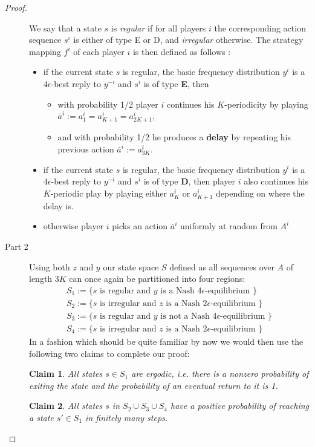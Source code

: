\documentclass[a4paper]{article}
\theoremstyle{plain}
\newtheorem{claim}{Claim}
\theoremstyle{remark}
\begin{document}
\begin{proof}
\begin{description}
		We say that a state $s$ is \emph{regular} if for all players $i$ the corresponding action
		sequence $s^i$ is either of type E or D, and \emph{irregular} otherwise.
		The strategy mapping $f^i$ of each player $i$ is then defined as follows :
		\begin{itemize}
			\item if the current state $s$ is regular, the basic frequency distribution $y^i$ is a $4\epsilon$-best reply to $y^{-i}$ %
			and $s^i$ is of type {\bf E}, then \begin{itemize}
				\item with probability 1/2 player $i$ continues his $K$-periodicity by playing $\bar{a}^i := a^i_1 = a^i_{K+1} = a^i_{2K+1}$,
				\item and with probability 1/2 he produces a {\bf delay} by repeating his previous action $\bar{a}^i := a^i_{3K}$.
			\end{itemize}
			\item if the current state $s$ is regular, the basic frequency distribution $y^i$ is a $4\epsilon$-best reply to $y^{-i}$ %
			and $s^i$ is of type {\bf D}, then player $i$ also continues his $K$-periodic play by playing either $a^i_K$ or $a^i_{K+1}$ depending
			on where the delay is.
			\item otherwise player $i$ picks an action $\bar{a}^i$ uniformly at random from $A^i$
		\end{itemize}
		\item[Part 2] Using both $z$ and $y$ our state space $S$ defined as all sequences over $A$ of length $3K$ can once again be partitioned
		into four regions:
		\begin{gather*}
			S_1 := \{ s \text{ is regular and $y$ is a Nash $4\epsilon$-equilibrium }\}\\
			S_2 := \{ s \text{ is irregular and $z$ is a Nash $2\epsilon$-equilibrium }\}\\
			S_3 := \{ s \text{ is regular and $y$ is not a Nash $4\epsilon$-equilibrium }\}\\
			S_4 := \{ s \text{ is irregular and $z$ is a Nash $2\epsilon$-equilibrium }\}
		\end{gather*}
		In a fashion which should be quite familiar by now we would then use the following two claims
		to complete our proof:
		\begin{claim}
			All states $s \in S_1$ are ergodic, i.e. there is a nonzero probability of exiting the
			state and the probability of an eventual return to it is 1.
		\end{claim}
		\begin{claim}
			All states $s$ in $S_2 \cup S_3 \cup S_4$ 
			have a positive probability of reaching a state $s' \in S_1$ in finitely many steps.
		\end{claim}
	\end{description}
\end{proof}
\end{document}
